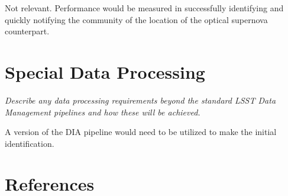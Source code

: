 \documentclass[12pt, letterpaper]{article}
\begin{document}
Not relevant.  Performance would be measured in successfully
identifying and quickly notifying the community of the location of the
optical supernova counterpart.


\vspace{.6in}

\section{Special Data Processing}
\begin{footnotesize}
{\it Describe any data processing requirements beyond the standard LSST Data Management pipelines and how these will be achieved.}
\end{footnotesize}

A version of the DIA pipeline would need to be utilized to make the
initial identification.

\section{References}

 

\end{document}
